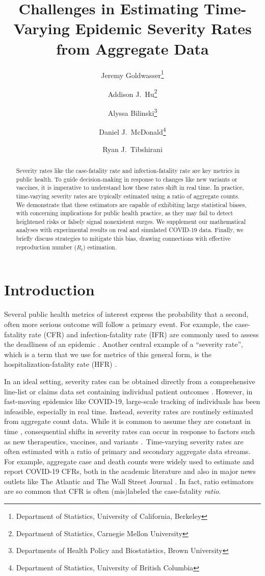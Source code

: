 \documentclass{article}
\title{Challenges in Estimating Time-Varying Epidemic Severity Rates from
  Aggregate Data}
\author{Jeremy Goldwasser\thanks{Department of Statistics, University of
    California, Berkeley} 
  \and  
  Addison J.\ Hu\thanks{Department of Statistics, Carnegie Mellon University}
  \and 
  Alyssa Bilinski\thanks{Departments of Health Policy and Biostatistics, Brown University} 
  \and
  Daniel J.\ McDonald\thanks{Department of Statistics, University of British
    Columbia} 
  \and 
  Ryan J.\ Tibshirani\footnotemark[1]}
\date{}
\begin{document}
\maketitle

\begin{abstract}
Severity rates like the case-fatality rate and infection-fatality rate are
key metrics in public health. To guide decision-making in response to changes
like new variants or vaccines, it is imperative to understand how these rates
shift in real time. In practice, time-varying severity rates are typically
estimated using a ratio of aggregate counts. We demonstrate that these
estimators are capable of exhibiting large statistical biases, with concerning
implications for public health practice, as they may fail to detect heightened 
risks or falsely signal nonexistent surges. We supplement our mathematical 
analyses with experimental results on real and simulated COVID-19 data. Finally,
we briefly discuss strategies to mitigate this bias, drawing connections with
effective reproduction number ($R_t$) estimation.    
\end{abstract}

\section{Introduction}

Several public health metrics of interest express the probability that a second,
often more serious outcome will follow a primary event. For example, the
case-fatality rate (CFR) and infection-fatality rate (IFR) are commonly used to
assess the deadliness of an epidemic \citep{nishiuraEx1, nishiuraEx2,
  cfr_line_list, timevar_ifr, lancet_ifr}. Another central example of a
``severity rate'', which is a term that we use for metrics of this general form,
is the hospitalization-fatality rate (HFR) \citep{HFR_linelist3, HFR_linelist1,  
  HFR_linelist2}.

In an ideal setting, severity rates can be obtained directly from a
comprehensive line-list or claims data set containing individual patient
outcomes \citep{HFR_linelist3, cfr_line_list, HFR_linelist1, HFR_linelist2}.
However, in fast-moving epidemics like COVID-19, large-scale tracking of
individuals has been infeasible, especially in real time. Instead, severity
rates are routinely estimated from aggregate count data. While it is common to
assume they are constant in time \citep{ghani, jewell2007nonparametric,
  reich2012estimating, lancet_controversial}, consequential shifts in severity
rates can occur in response to factors such as new therapeutics, vaccines, and
variants \citep{nyt}. Time-varying severity rates are often estimated with a
ratio of primary and secondary aggregate data streams. For example, aggregate 
case and death counts were widely used to estimate and report COVID-19 CFRs, 
both in the academic literature \citep{yuan2020monitoring, timevar_ifr,
  horita2022global, LIU2023100350, germany} and also in major news outlets like
The Atlantic \citep{atlantic} and The Wall Street Journal \citep{wsj}. In fact,
ratio estimators are so common that CFR is often (mis)labeled the case-fatality
\emph{ratio}. 
\end{document}

